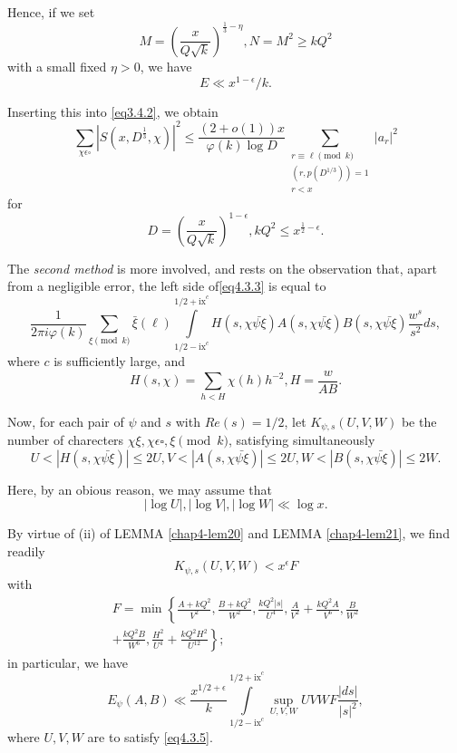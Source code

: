 Hence, if we set 
$$
M = (\frac{x}{Q\sqrt{k}})^{\frac{1}{3}-\eta}, N=M^2 \ge k Q^2 
$$
with a small fixed $\eta > 0$, we have
$$
E \ll x^{1-\epsilon }/k.
$$

Inserting this into \eqref{eq3.4.2}, we obtain 
\begin{equation*}
\sum_{\chi \epsilon  \square }|S \left(x, D^{\frac{1}{3}},
  \chi\right)|^2  \le \frac{(2+o(1))x} {\varphi(k) \log D}
  \sum_{\substack{r \equiv \ell \pmod{k}\\ (r, p(D^{1/3})) =
      1\\ r<x}} |a_r|^2 \tag{4.3.4}\label{eq4.3.4}
\end{equation*}
for
$$
  D = \left(\frac{x}{Q\sqrt{k}}\right)^{1-\epsilon }, kQ^2 \le
  x^{\frac{1}{2} -\epsilon}.
$$

The \textit{second method} is more involved, and rests on the
observation that, apart from a negligible error, the left side
of\pageoriginale  \eqref{eq4.3.3} is equal to  
$$
\frac{1}{2 \pi i \varphi(k)} \sum_{\xi \pmod{k}} \bar{\xi}(\ell)
\int\limits_{1/2 - \text{ix}^c}^{1/2 + \text{ix}^c} H (s, \chi \bar{\psi \xi}) A
(s, \chi \bar{\psi \xi}) B (s, \chi \bar{\psi \xi}) \frac{w^s}{s^2}
ds,  
$$
where $c$ is sufficiently large, and 
$$
H (s, \chi) = \sum_{h < H} \chi (h)h^{-2}, H=\frac{w}{AB}.
$$

Now, for each pair of $\psi$ and $s$ with $Re(s) = 1/2$, let
$K_{\psi,s}(U,V,W)$ be the number of charecters $\chi \xi, \chi
\epsilon  \square, \xi \pmod{k}$, satisfying simultaneously  
$$
U < |H(s, \chi \bar{\psi \xi})| \le 2U,V < |A(s, \chi \bar{\psi
  \xi})|\le 2U, W< |B(s, \chi \bar{\psi \xi})| \le 2W. 
$$

Here, by an obious reason, we may assume that 
\begin{equation*}
  |\log U|,|\log V|,|\log W| \ll \log x. \tag{4.3.5}\label{eq4.3.5}
\end{equation*}

By virtue of (ii) of LEMMA \ref{chap4-lem20} and LEMMA
\ref{chap4-lem21}, we find readily  
$$
K_{\psi, s} (U,V,W) < x^\epsilon  F
$$
with 
\begin{multline*}
  F=\min  \left\{ \frac{A+kQ^2}{V^2}, \frac{B+kQ^2}{W^2},\frac{kQ^2|s|}{U^4},
  \frac{A}{V^2}+ \frac{kQ^2 A}{V^6}, \frac{B}{W^2}\right.\\ 
  \left.+\frac{kQ^2
    B}{W^6}, \frac{H^2}{U^4} + \frac{kQ^2 H^2}{U^{12}}\right\}; 
\end{multline*}
in particular, we have
$$
  E_\psi (A,B) \ll \frac{x^{1/2+\epsilon }}{k} \int\limits_
  {1/2-\text{ix}^c}^{1/2+\text{ix}^c} \sup_{U,V,W} UVWF \frac{|ds|}{|s|^2}, 
$$
where $U,V,W$ are to satisfy \eqref{eq4.3.5}. 

